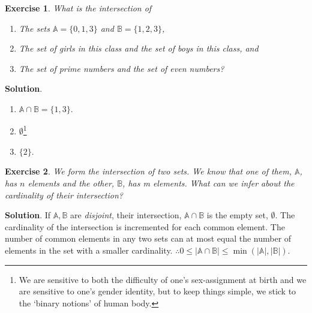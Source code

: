 \documentclass[11pt]{book}
\theoremstyle{definition}
\theoremstyle{plain}
\newtheorem{exercise}{Exercise}
\theoremstyle{definition}
\theoremstyle{problemstyle}
\theoremstyle{remark}
\theoremstyle{definition}
\begin{document}
\begin{exercise}
    What is the intersection of
    \begin{enumerate}[label={(\alph*)}]
        \item The sets $\mathbb{A}=\{0,1,3\}$ and $\mathbb{B}=\{1,2,3\}$,
        \item The set of girls in this class and the set of boys in this class, and
        \item The set of prime numbers and the set of even numbers?
    \end{enumerate}
    \label{ex:1.2.14}
\end{exercise}
\textbf{Solution}.
    \begin{enumerate}[label={(\alph*)}]
        \item $\mathbb{A}\cap\mathbb{B}=\{1,3\}$.
        \item $\emptyset$\footnote{We are sensitive to both the difficulty of one's sex-assignment at birth and we are sensitive to one's gender identity, but to keep things simple, we stick to the `binary notions' of human body.}
        \item $\{2\}$.
    \end{enumerate}
\begin{exercise}
    We form the intersection of two sets. We know that one of them, $\mathbb{A}$, has $n$ elements and the other, $\mathbb{B}$, has m elements. What can we infer about the cardinality of their intersection?
    \label{ex:1.2.15}
\end{exercise}
\textbf{Solution}.
If $\mathbb{A},\mathbb{B}$ are \emph{disjoint}, their intersection, $\mathbb{A}\cap\mathbb{B}$ is the empty set, $\emptyset$. The cardinality of the intersection is incremented for each common element. The number of common elements in any two sets can at most equal the number of elements in the set with a smaller cardinality. $\therefore 0\leq\lvert\mathbb{A}\cap\mathbb{B}\rvert\leq\min(\lvert\mathbb{A}\rvert,\lvert\mathbb{B}\rvert)$.
\end{document}
